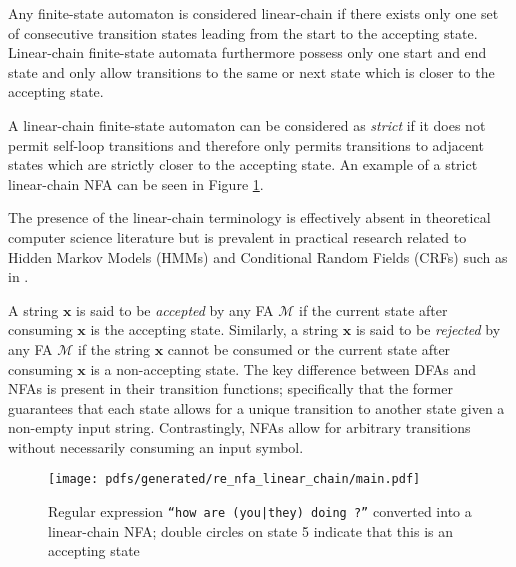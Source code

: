 \begin{definition}
  \label{def:lfa}
  Any finite-state automaton is considered linear-chain if there exists only one
  set of consecutive transition states leading from the start to the accepting
  state. Linear-chain finite-state automata furthermore possess only one start
  and end state and only allow transitions to the same or next state which is
  closer to the accepting state.

  \begin{remark}
    A linear-chain finite-state automaton can be considered as \textit{strict}
    if it does not permit self-loop transitions and therefore only permits
    transitions to adjacent states which are strictly closer to the
    accepting state. An example of a strict linear-chain NFA can be seen in
    Figure \ref{fig:regex_fa}.
  \end{remark}

  \begin{remark}
    The presence of the linear-chain terminology is effectively absent in
    theoretical computer science literature but is prevalent in practical
    research related to Hidden Markov Models (HMMs) and Conditional Random
    Fields (CRFs) such as in \citet{tsuruoka2009fast}.
  \end{remark}
  
\end{definition}

A string $\bm{x}$ is said to be \textit{accepted} by any FA $\mathcal{M}$ if
the current state after consuming $\bm{x}$ is the accepting state. Similarly, a
string $\bm{x}$ is said to be \textit{rejected} by any FA $\mathcal{M}$ if the
string $\bm{x}$ cannot be consumed or the current state after consuming
$\bm{x}$ is a non-accepting state. The key difference between DFAs and NFAs is
present in their transition functions; specifically that the former guarantees
that each state allows for a unique transition to another state given a
non-empty input string. Contrastingly, NFAs allow for arbitrary transitions
without necessarily consuming an input symbol.

\begin{figure}[t]
  \centering
  \texttt{[image: pdfs/generated/re\_nfa\_linear\_chain/main.pdf]}
  \caption{Regular expression \texttt{``how are (you|they) doing ?''} converted
    into a linear-chain NFA; double circles on state 5 indicate that this is an
    accepting state}
  \label{fig:regex_fa}
\end{figure}

